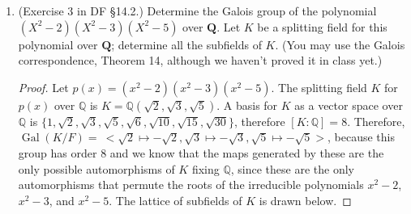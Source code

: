 \documentclass[10pt]{article}
\newcommand{\Q}{\mathbb{Q}}
\DeclareMathOperator*{\Gal}{Gal}
\begin{document}
\begin{enumerate}
\begin{proof}
\end{proof}

(b) Let $G \leq \Gal(K/F)$ be a subgroup of the Galois group of the extension $K/F$ and suppose $\sigma_1,\ldots,\sigma_k$ are generators for $G$ (i.e., $G = \langle \sigma_1,\ldots,\sigma_k \rangle$).  Show that if $E$ is an intermediate subfield ($F \subset E \subset K$), then $E$ is fixed by $G$ if and only if it is fixed by the generators $\sigma_1,\ldots,\sigma_k$.

\begin{proof}

Clearly, if some $\sigma_i$ does not fix $E$ then $G$ does not fix $E$, since $\sigma_i \in G$.  Now, suppose $\sigma_i$ fixes $E$ for all $i$, and let $\sigma \in G$.  Then $\sigma = \sigma_1^{n_1} \circ \cdots \circ \sigma_k^{n_k}$ for some $n_1, \dots , n_k$.  Then for any $\alpha \in E$, we have
\begin{align*}
\sigma(\alpha) &= \sigma_1^{n_1} \circ \cdots \circ \sigma_k^{n_k}(\alpha) = \sigma_1^{n_1} \circ \cdots \circ \sigma_{k-1}^{n_{k-1}}(\sigma_n^{n_k}(\alpha))
\\
&= \sigma_1^{n_1} \circ \cdots \circ \sigma_{k-1}^{n_{k-1}}(\text{id}(\alpha)) = \sigma_1^{n_1} \circ \cdots \circ \sigma_{k-1}^{n_{k-1}}(\alpha)
\\
&= \cdots = \sigma_1^{n_1}(\alpha) = \alpha.
\end{align*}
So an arbitrary $\sigma \in G$ fixes an arbitrary $\alpha\in E$, thus $G$ fixes $E$.
\end{proof}

\item (Exercise 3 in DF \S 14.2.) Determine the Galois group of the polynomial $(X^2-2)(X^2-3)(X^2-5)$ over $\mathbf{Q}$.  Let $K$ be a splitting field for this polynomial over $\mathbf{Q}$; determine all the subfields of $K$.  (You may use the Galois correspondence, Theorem 14, although we haven't proved it in class yet.)

\begin{proof}

Let $p(x) = (x^2 - 2)(x^2 - 3)(x^2 - 5)$.  The splitting field $K$ for $p(x)$ over $\Q$ is $K = \Q(\sqrt{2}, \sqrt{3}, \sqrt{5})$.  A basis for $K$ as a vector space over $\Q$ is $\{1, \sqrt{2}, \sqrt{3}, \sqrt{5}, \sqrt{6}, \sqrt{10}, \sqrt{15}, \sqrt{30} \}$, therefore $[K:\Q] = 8 $.  Therefore, $\Gal(K/F) = \ <\sqrt{2} \mapsto -\sqrt{2}, \sqrt{3} \mapsto -\sqrt{3}, \sqrt{5} \mapsto -\sqrt{5}>$, because this group has order $8$ and we know that the maps generated by these are the only possible automorphisms of $K$ fixing $\Q$, since these are the only automorphisms that permute the roots of the irreducible polynomials $x^2 - 2$, $x^2 - 3$, and $x^2-5$.  The lattice of subfields of $K$ is drawn below.


\end{proof}
\end{enumerate}
\end{document}
